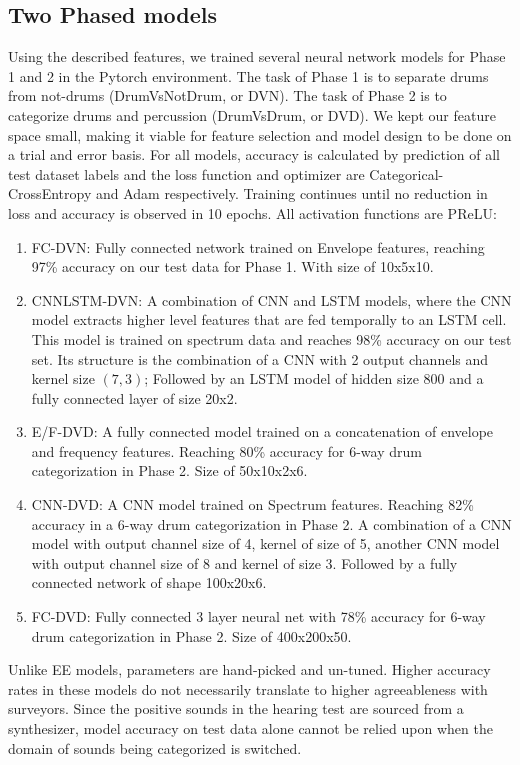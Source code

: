 \documentclass[runningheads,a4paper]{llncs}
\begin{document}
\begin{appendices}
\section{Two Phased models}
Using the described features, we trained several neural network models for Phase 1 and 2 in the Pytorch environment. The task of Phase 1 is to separate drums from not-drums (DrumVsNotDrum, or DVN). The task of Phase 2 is to categorize drums and percussion (DrumVsDrum, or DVD). We kept our feature space small, making it viable for feature selection and model design to be done on a trial and error basis. For all models, accuracy is calculated by prediction of all test dataset labels and the loss function and optimizer are Categorical-CrossEntropy and Adam respectively. Training continues until no reduction in loss and accuracy is observed in 10 epochs.  All activation functions are PReLU:
\begin {enumerate}
\item FC-DVN: Fully connected network trained on Envelope features, reaching 97\% accuracy on our test data for Phase 1. With size of 10x5x10.
\item CNNLSTM-DVN: A combination of CNN and LSTM models, where the CNN model extracts higher level features that are fed temporally to an LSTM cell. This model is trained on spectrum data and reaches 98\% accuracy on our test set. Its structure is the combination of a CNN with 2 output channels and kernel size $(7,3)$; Followed by an LSTM model of hidden size 800 and a fully connected layer of size 20x2.
\item E/F-DVD: A fully connected model trained on a concatenation of envelope and frequency features. Reaching 80\% accuracy for 6-way drum categorization in Phase 2. Size of 50x10x2x6.
\item CNN-DVD: A CNN model trained on Spectrum features. Reaching 82\% accuracy in a 6-way drum categorization in Phase 2. A combination of a CNN model with output channel size of 4, kernel of size of 5, another CNN model with output channel size of 8 and kernel of size 3. Followed by a fully connected network of shape 100x20x6.
\item FC-DVD: Fully connected 3 layer neural net with 78\% accuracy for 6-way drum categorization in Phase 2. Size of 400x200x50.
\end{enumerate}
Unlike EE models, parameters are hand-picked and un-tuned. Higher accuracy rates in these models do not necessarily translate to higher agreeableness with surveyors. Since the positive sounds in the hearing test are sourced from a synthesizer, model accuracy on test data alone cannot be relied upon when the domain of sounds 
being categorized is switched.

\end{appendices}
\end{document}
